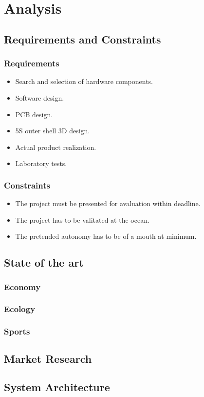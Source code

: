 \chapter{Analysis}
\section{Requirements and Constraints}
\subsection{Requirements}
\begin{itemize}
    \item Search and selection of hardware components.
    \item Software design.
    \item PCB design.
    \item 5S outer shell 3D design.
    \item Actual product realization.
    \item Laboratory tests.
\end{itemize}
\subsection{Constraints}
\begin{itemize}
    \item The project must be presented for avaluation within deadline.
    \item The project has to be valitated at the ocean.
    \item The pretended autonomy has to be of a mouth at minimum.
\end{itemize}
\section{State of the art}
\subsection{Economy}
\subsection{Ecology}
\subsection{Sports}
\section{Market Research}
\section{System Architecture}